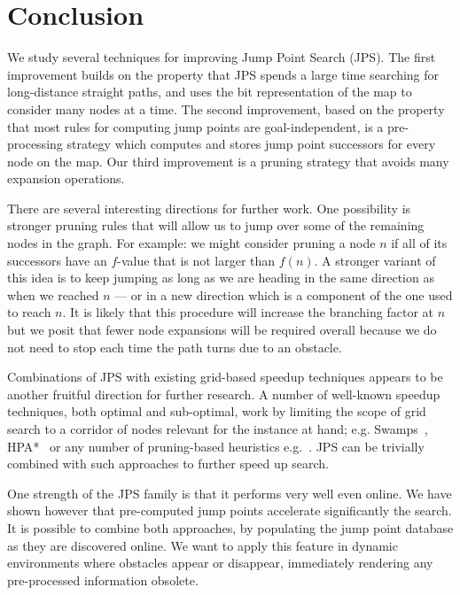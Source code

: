 \section{Conclusion}
\label{sec::conclusion}

We study several techniques for improving Jump Point Search (JPS).  
The first improvement builds on the property 
that JPS spends a large time searching for long-distance straight paths, 
and uses the bit representation of the map to consider many nodes at a time.  
The second improvement, based on the property 
that most rules for computing jump points are goal-independent, 
is a pre-processing strategy 
which computes and stores jump point successors for every node on the map.  
Our third improvement is a pruning strategy 
that avoids many expansion operations.  

There are several interesting directions for further work. One possibility is
stronger pruning rules that will allow us to jump over some of the remaining
nodes in the graph. For example: we might consider %
pruning a node $n$ if all of its successors have
an $f$-value that is not larger than $f(n)$. A stronger variant of this idea
is to keep jumping as long as we are heading in the same direction as when we
reached $n$ --- or in a new direction which is a component of the one used to
reach $n$. It is likely that this procedure will increase the branching factor
at $n$ but we posit that fewer node expansions will be required overall because
we do not need to stop each time the path turns due to an obstacle.

Combinations of JPS with existing grid-based speedup 
techniques appears to be another fruitful direction for further research. 
A number of well-known speedup techniques, both optimal and sub-optimal,
work by limiting the scope of grid search to a corridor of nodes relevant
for the instance at hand; e.g. Swamps~\cite{pochter10}, HPA{*}~\cite{botea04}
or any number of pruning-based heuristics e.g.~\cite{bjornsson05,goldenberg10}.
JPS can be trivially combined with such approaches to further speed up search.

One strength of the JPS family 
is that it performs very well even online.  
We have shown however that pre-computed jump points 
accelerate significantly the search.  
It is possible to combine both approaches, 
by populating the jump point database 
as they are discovered online.  
We want to apply this feature in dynamic environments 
where obstacles appear or disappear, 
immediately rendering any pre-processed information obsolete.  

